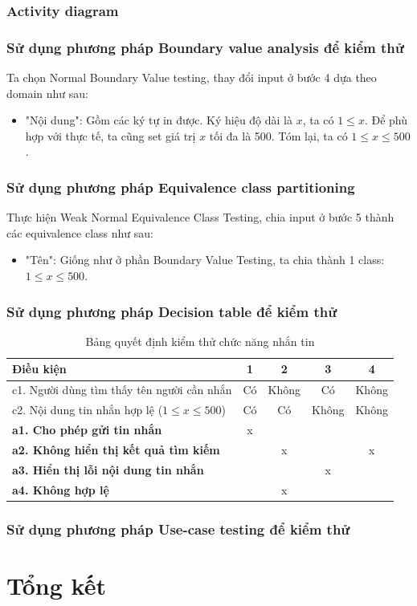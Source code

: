 \documentclass[a4paper, 12pt]{article}
\begin{document}
\subsubsection{Activity diagram}
\subsubsection{Sử dụng phương pháp Boundary value analysis để kiểm thử}
Ta chọn Normal Boundary Value testing, thay đổi input ở bước 4 dựa theo domain như sau:
\begin{itemize}
    \item "Nội dung": Gồm các ký tự in được. Ký hiệu độ dài là $x$, ta có $1 \leq x$. Để phù hợp với thực tế, ta cũng set giá trị $x$ tối đa là 500. Tóm lại, ta có $1 \leq x \leq 500$.
\end{itemize}

\subsubsection{Sử dụng phương pháp Equivalence class partitioning}
Thực hiện Weak Normal Equivalence Class Testing, chia input ở bước 5 thành các equivalence class như sau:
\begin{itemize}
    \item "Tên": Giống như ở phần Boundary Value Testing, ta chia thành 1 class: $1 \leq x \leq 500$.
\end{itemize}
\subsubsection{Sử dụng phương pháp Decision table để kiểm thử}

\begin{table}[H]
    \centering
    \begin{tabular}{|l|c|c|c|c|}
        \hline
        \textbf{Điều kiện} & \textbf{1} & \textbf{2} & \textbf{3} & \textbf{4} \\
        \hline
        c1. Người dùng tìm thấy tên người cần nhắn & Có & Không & Có & Không \\
        \hline
        c2. Nội dung tin nhắn hợp lệ ($1 \leq x \leq 500$) & Có & Có & Không & Không \\\hline
        \hline
        \textbf{a1. Cho phép gửi tin nhắn} & x & & & \\
        \hline
        \textbf{a2. Không hiển thị kết quả tìm kiếm} & & x & &x \\
        \hline
        \textbf{a3. Hiển thị lỗi nội dung tin nhắn} & & &x & \\\hline
        \textbf{a4. Không hợp lệ} & &x & & \\
        \hline
    \end{tabular}
    \caption{Bảng quyết định kiểm thử chức năng nhắn tin}
    \label{tab:decision-table}
\end{table}

\subsubsection{Sử dụng phương pháp Use-case testing để kiểm thử}

\section{Tổng kết}
\end{document}
